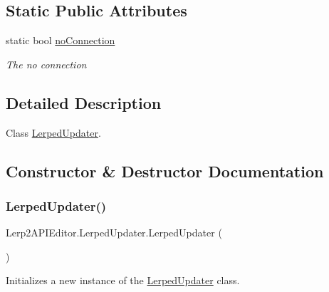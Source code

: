 \subsection*{Static Public Attributes}
\begin{DoxyCompactItemize}
\item 
static bool \hyperlink{class_lerp2_a_p_i_editor_1_1_lerped_updater_a64bb670cd57ee4078cf1835934cb870a}{no\+Connection}
\begin{DoxyCompactList}\small\item\em The no connection \end{DoxyCompactList}\end{DoxyCompactItemize}


\subsection{Detailed Description}
Class \hyperlink{class_lerp2_a_p_i_editor_1_1_lerped_updater}{Lerped\+Updater}. 



\subsection{Constructor \& Destructor Documentation}
\mbox{\label{class_lerp2_a_p_i_editor_1_1_lerped_updater_a8d527466ef6e3184716ad0e9275f5a5a}} 
\subsubsection{\texorpdfstring{Lerped\+Updater()}{LerpedUpdater()}\hspace{0.1cm}{\footnotesize\ttfamily [1/2]}}
{\footnotesize\ttfamily Lerp2\+A\+P\+I\+Editor.\+Lerped\+Updater.\+Lerped\+Updater (\begin{DoxyParamCaption}{ }\end{DoxyParamCaption})\hspace{0.3cm}{\ttfamily [inline]}}



Initializes a new instance of the \hyperlink{class_lerp2_a_p_i_editor_1_1_lerped_updater}{Lerped\+Updater} class. 

\mbox{\label{class_lerp2_a_p_i_editor_1_1_lerped_updater_a7b76ab00342f20c44ce74977f713a60f}} 

